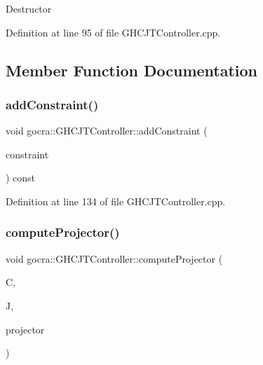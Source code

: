Destructor 

Definition at line 95 of file G\+H\+C\+J\+T\+Controller.\+cpp.



\subsection{Member Function Documentation}
\hypertarget{classgocra_1_1GHCJTController_a04da6a1642a2f6e79c2a6cf375ff703c}{}\label{classgocra_1_1GHCJTController_a04da6a1642a2f6e79c2a6cf375ff703c} 
\subsubsection{\texorpdfstring{add\+Constraint()}{addConstraint()}}
{\footnotesize\ttfamily void gocra\+::\+G\+H\+C\+J\+T\+Controller\+::add\+Constraint (\begin{DoxyParamCaption}\item[{\hyperlink{namespaceocra_ae8b87cf4099be3efc3b410019ad2046e}{ocra\+::\+Linear\+Constraint} \&}]{constraint }\end{DoxyParamCaption}) const}



Definition at line 134 of file G\+H\+C\+J\+T\+Controller.\+cpp.

\hypertarget{classgocra_1_1GHCJTController_ab06ee2982ac337cdad4d11fe2a570e94}{}\label{classgocra_1_1GHCJTController_ab06ee2982ac337cdad4d11fe2a570e94} 
\subsubsection{\texorpdfstring{compute\+Projector()}{computeProjector()}}
{\footnotesize\ttfamily void gocra\+::\+G\+H\+C\+J\+T\+Controller\+::compute\+Projector (\begin{DoxyParamCaption}\item[{const Eigen\+::\+Matrix\+Xd \&}]{C,  }\item[{const Eigen\+::\+Matrix\+Xd \&}]{J,  }\item[{Eigen\+::\+Matrix\+Xd \&}]{projector }\end{DoxyParamCaption})}



